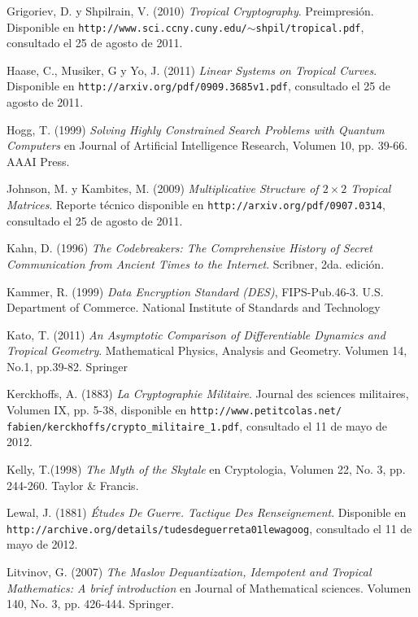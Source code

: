 \documentclass[spanish,12pt,twoside]{book}
\newcommand{\ttt}[1]{\texttt{#1}}
\theoremstyle{definition}
\begin{document}
\begin{thebibliography}{50}
		 Grigoriev, D. y Shpilrain, V. (2010) \emph{Tropical Cryptography}. Preimpresión. Disponible en \ttt{http://www.sci.ccny.cuny.edu/$\sim$shpil/tropical.pdf}, consultado el 25 de agosto de 2011.

		 Haase, C., Musiker, G y Yo, J. (2011) \emph{Linear Systems on Tropical Curves}. Disponible en \ttt{http://arxiv.org/pdf/0909.3685v1.pdf}, consultado el 25 de agosto de 2011.

 		 Hogg, T. (1999) \emph{Solving Highly Constrained Search Problems with Quantum Computers} en Journal of Artificial Intelligence Research, Volumen 10, pp. 39-66. AAAI Press.%

     Johnson, M. y Kambites, M. (2009) \emph{Multiplicative Structure of $2\times 2$ Tropical Matrices}. Reporte técnico disponible en \ttt{http://arxiv.org/pdf/0907.0314}, consultado el 25 de agosto de 2011.
    
		 Kahn, D. (1996) \emph{The Codebreakers: The Comprehensive History of Secret Communication from Ancient Times to the Internet}. Scribner, 2da. edición.

		 Kammer, R. (1999) \emph{Data Encryption Standard (DES)}, FIPS-Pub.46-3. U.S. Department of Commerce. National Institute of Standards and Technology%
	  
	   Kato, T. (2011) \emph{An Asymptotic Comparison of Differentiable Dynamics and Tropical Geometry}. Mathematical Physics, Analysis and Geometry. Volumen 14, No.1, pp.39-82. Springer

	   Kerckhoffs, A. (1883) \emph{La Cryptographie Militaire}. Journal des sciences militaires, Volumen IX, pp. 5-38, disponible en \ttt{http://www.petitcolas.net/ fabien/kerckhoffs/crypto\_militaire\_1.pdf}, consultado el 11 de mayo de 2012.

		  Kelly, T.(1998) \emph{The Myth of the Skytale} en Cryptologia, Volumen 22, No. 3, pp. 244-260. Taylor \& Francis.%
		
		 Lewal, J. (1881) \emph{Études De Guerre. Tactique Des Renseignement}. Disponible en \ttt{http://archive.org/details/tudesdeguerreta01lewagoog}, consultado el 11 de mayo de 2012.

		  Litvinov, G. (2007) \emph{The Maslov Dequantization, Idempotent and Tropical Mathematics: A brief introduction} en Journal of Mathematical sciences. Volumen 140, No. 3, pp. 426-444. Springer.


\end{thebibliography}
\end{document}
